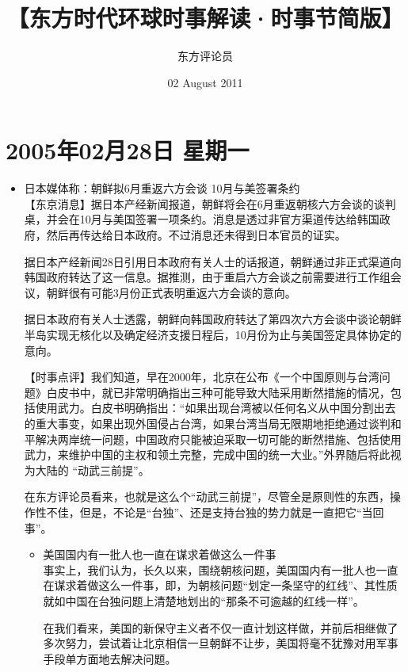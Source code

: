 \documentclass[a4paper,11pt]{article}
\title{【东方时代环球时事解读·时事节简版】}
\author{东方评论员}
\date{02 August 2011}
\begin{document}
\maketitle

\setcounter{tocdepth}{1}
\tableofcontents
\vspace*{1cm}

\section{2005年02月28日 星期一}
\label{sec-1}
\begin{itemize}

\item 日本媒体称：朝鲜拟6月重返六方会谈 10月与美签署条约\\
\label{sec-1_1}%
【东京消息】据日本产经新闻报道，朝鲜将会在6月重返朝核六方会谈的谈判桌，并会在10月与美国签署一项条约。消息是透过非官方渠道传达给韩国政府，然后再传达给日本政府。不过消息还未得到日本官员的证实。

  据日本产经新闻28日引用日本政府有关人士的话报道，朝鲜通过非正式渠道向韩国政府转达了这一信息。据推测，由于重启六方会谈之前需要进行工作组会议，朝鲜很有可能3月份正式表明重返六方会谈的意向。

  据日本政府有关人士透露，朝鲜向韩国政府转达了第四次六方会谈中谈论朝鲜半岛实现无核化以及确定经济支援日程后，10月份为止与美国签定具体协定的意向。

  【时事点评】我们知道，早在2000年，北京在公布《一个中国原则与台湾问题》白皮书中，就已非常明确指出三种可能导致大陆采用断然措施的情况，包括使用武力。白皮书明确指出：“如果出现台湾被以任何名义从中国分割出去的重大事变，如果出现外国侵占台湾，如果台湾当局无限期地拒绝通过谈判和平解决两岸统一问题，中国政府只能被迫采取一切可能的断然措施、包括使用武力，来维护中国的主权和领土完整，完成中国的统一大业。”外界随后将此视为大陆的 “动武三前提”。

  在东方评论员看来，也就是这么个“动武三前提”，尽管全是原则性的东西，操作性不佳，但是，不论是“台独”、还是支持台独的势力就是一直把它“当回事”。

\begin{itemize}

\item 美国国内有一批人也一直在谋求着做这么一件事\\
\label{sec-1_1_1}%
事实上，我们认为，长久以来，围绕朝核问题，美国国内有一批人也一直在谋求着做这么一件事，即，为朝核问题“划定一条坚守的红线”、其性质就如中国在台独问题上清楚地划出的“那条不可逾越的红线一样”。

    在我们看来，美国的新保守主义者不仅一直计划这样做，并前后相继做了多次努力，尝试着让北京相信一旦朝鲜不让步，美国将毫不犹豫对用军事手段单方面地去解决问题。
 

\end{itemize}
\end{itemize}
\end{document}
